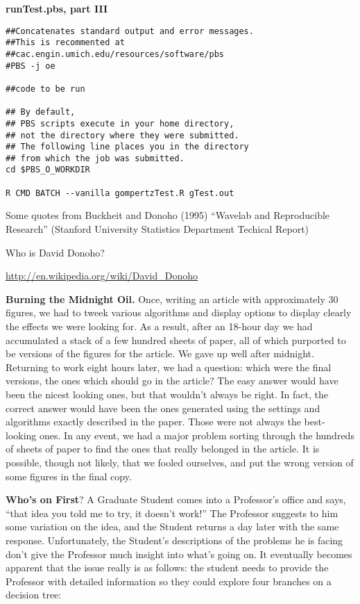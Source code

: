 \documentclass[portrait,11pt]{seminar}
\begin{document}
\bs
{\bf runTest.pbs, part III}

\begin{verbatim}
##Concatenates standard output and error messages.
##This is recommented at 
##cac.engin.umich.edu/resources/software/pbs
#PBS -j oe

##code to be run

## By default,
## PBS scripts execute in your home directory, 
## not the directory where they were submitted. 
## The following line places you in the directory 
## from which the job was submitted.
cd $PBS_O_WORKDIR

R CMD BATCH --vanilla gompertzTest.R gTest.out
\end{verbatim}

\es

\bs Some quotes from Buckheit and Donoho (1995) ``Wavelab and Reproducible Research'' (Stanford University Statistics Department Techical Report)

\medskip

Who is David Donoho?

\url{http://en.wikipedia.org/wiki/David_Donoho}

\es

\bs

{\bf Burning the Midnight Oil.} Once, writing an article with approximately 30 figures,
we had to tweek various algorithms and display options to display clearly the effects
we were looking for. As a result, after an 18-hour day we had accumulated a stack
of a few hundred sheets of paper, all of which purported to be versions of the figures
for the article. We gave up well after midnight.
Returning to work eight hours later, we had a question: which were the final
versions, the ones which should go in the article? The easy answer would have been
the nicest looking ones, but that wouldn't always be right. In fact, the correct
answer would have been the ones generated using the settings and algorithms
exactly described in the paper. Those were not always the best-looking ones.
In any event, we had a major problem sorting through the hundreds of sheets of
paper to find the ones that really belonged in the article. It is possible, though not
likely, that we fooled ourselves, and put the wrong version of some figures in the final copy.

\es

\bs

{\bf Who's on First}? A Graduate Student comes into a Professor's office and says, ``that
idea you told me to try, it doesn't work!'' The Professor suggests to him some
variation on the idea, and the Student returns a day later with the same response.
Unfortunately, the Student's descriptions of the problems he is facing don't give
the Professor much insight into what's going on.
It eventually becomes apparent that the issue really is as
follows: the student needs to provide the Professor with detailed information
so they could explore four branches on a decision tree:
\end{document}
